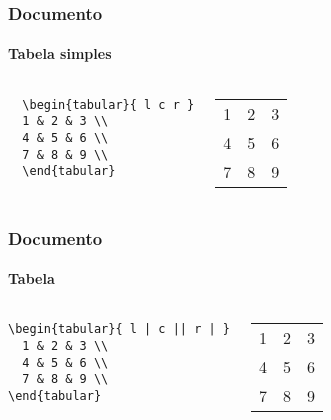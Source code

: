 \begin{frame}[fragile]
\frametitle{Documento}
\framesubtitle{Tabela simples}
  \scriptsize
  \begin{columns}[c]
  \begin{verbatim}
  \begin{tabular}{ l c r }
  1 & 2 & 3 \\
  4 & 5 & 6 \\
  7 & 8 & 9 \\
  \end{tabular}
  \end{verbatim}
  \begin{fmpage}{\textwidth}
  \begin{tabular}{ l c r }
  1 & 2 & 3 \\
  4 & 5 & 6 \\
  7 & 8 & 9 \\
  \end{tabular}
  \end{fmpage}
  \end{columns}
\end{frame}


\begin{frame}[fragile]
\frametitle{Documento}
\framesubtitle{Tabela}
  \scriptsize
  \begin{columns}[c]
  \begin{verbatim}
\begin{tabular}{ l | c || r | }
  1 & 2 & 3 \\
  4 & 5 & 6 \\
  7 & 8 & 9 \\
\end{tabular}
  \end{verbatim}
  \begin{fmpage}{\textwidth}
\begin{tabular}{ l | c || r | }
  1 & 2 & 3 \\
  4 & 5 & 6 \\
  7 & 8 & 9 \\
\end{tabular}
  \end{fmpage}
  \end{columns}
\end{frame}



